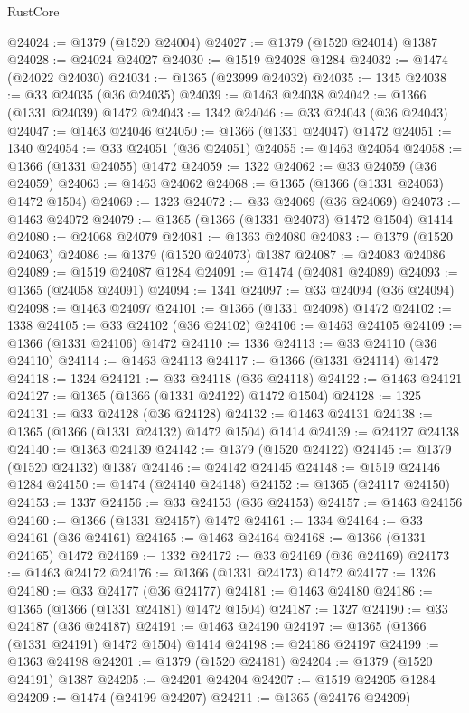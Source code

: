 \begin{lexlean}{RustCore}
\begin{coremodule}
@24024 := @1379 (@1520 @24004)
@24027 := @1379 (@1520 @24014) @1387
@24028 := @24024 @24027
@24030 := @1519 @24028 @1284
@24032 := @1474 (@24022 @24030)
@24034 := @1365 (@23999 @24032)
@24035 := 1345
@24038 := @33 @24035 (@36 @24035)
@24039 := @1463 @24038
@24042 := @1366 (@1331 @24039) @1472
@24043 := 1342
@24046 := @33 @24043 (@36 @24043)
@24047 := @1463 @24046
@24050 := @1366 (@1331 @24047) @1472
@24051 := 1340
@24054 := @33 @24051 (@36 @24051)
@24055 := @1463 @24054
@24058 := @1366 (@1331 @24055) @1472
@24059 := 1322
@24062 := @33 @24059 (@36 @24059)
@24063 := @1463 @24062
@24068 := @1365 (@1366 (@1331 @24063) @1472 @1504)
@24069 := 1323
@24072 := @33 @24069 (@36 @24069)
@24073 := @1463 @24072
@24079 := @1365 (@1366 (@1331 @24073) @1472 @1504) @1414
@24080 := @24068 @24079
@24081 := @1363 @24080
@24083 := @1379 (@1520 @24063)
@24086 := @1379 (@1520 @24073) @1387
@24087 := @24083 @24086
@24089 := @1519 @24087 @1284
@24091 := @1474 (@24081 @24089)
@24093 := @1365 (@24058 @24091)
@24094 := 1341
@24097 := @33 @24094 (@36 @24094)
@24098 := @1463 @24097
@24101 := @1366 (@1331 @24098) @1472
@24102 := 1338
@24105 := @33 @24102 (@36 @24102)
@24106 := @1463 @24105
@24109 := @1366 (@1331 @24106) @1472
@24110 := 1336
@24113 := @33 @24110 (@36 @24110)
@24114 := @1463 @24113
@24117 := @1366 (@1331 @24114) @1472
@24118 := 1324
@24121 := @33 @24118 (@36 @24118)
@24122 := @1463 @24121
@24127 := @1365 (@1366 (@1331 @24122) @1472 @1504)
@24128 := 1325
@24131 := @33 @24128 (@36 @24128)
@24132 := @1463 @24131
@24138 := @1365 (@1366 (@1331 @24132) @1472 @1504) @1414
@24139 := @24127 @24138
@24140 := @1363 @24139
@24142 := @1379 (@1520 @24122)
@24145 := @1379 (@1520 @24132) @1387
@24146 := @24142 @24145
@24148 := @1519 @24146 @1284
@24150 := @1474 (@24140 @24148)
@24152 := @1365 (@24117 @24150)
@24153 := 1337
@24156 := @33 @24153 (@36 @24153)
@24157 := @1463 @24156
@24160 := @1366 (@1331 @24157) @1472
@24161 := 1334
@24164 := @33 @24161 (@36 @24161)
@24165 := @1463 @24164
@24168 := @1366 (@1331 @24165) @1472
@24169 := 1332
@24172 := @33 @24169 (@36 @24169)
@24173 := @1463 @24172
@24176 := @1366 (@1331 @24173) @1472
@24177 := 1326
@24180 := @33 @24177 (@36 @24177)
@24181 := @1463 @24180
@24186 := @1365 (@1366 (@1331 @24181) @1472 @1504)
@24187 := 1327
@24190 := @33 @24187 (@36 @24187)
@24191 := @1463 @24190
@24197 := @1365 (@1366 (@1331 @24191) @1472 @1504) @1414
@24198 := @24186 @24197
@24199 := @1363 @24198
@24201 := @1379 (@1520 @24181)
@24204 := @1379 (@1520 @24191) @1387
@24205 := @24201 @24204
@24207 := @1519 @24205 @1284
@24209 := @1474 (@24199 @24207)
@24211 := @1365 (@24176 @24209)

\end{coremodule}
\end{lexlean}

